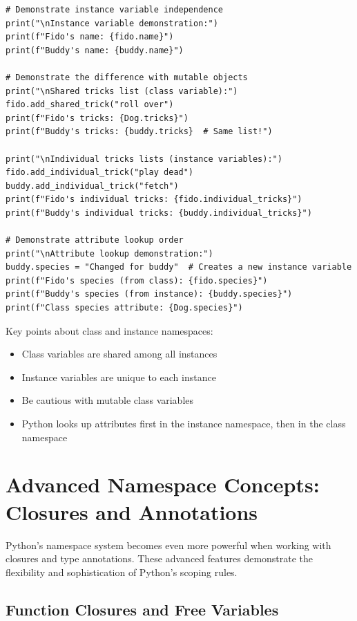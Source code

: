 \documentclass[12pt,letterpaper]{article}
\newenvironment{macterminal}{%
    \begin{mdframed}[
        linecolor=terminalFrame,
        backgroundcolor=terminalBg,
        roundcorner=5pt,
        skipabove=5pt,
        skipbelow=5pt,
        linewidth=1pt,
        innertopmargin=5pt,
        frametitle={%
            \tikz[baseline=(current bounding box.east), outer sep=0pt]{
                \fill[red!80!black] (0,0) circle (5pt);
                \fill[yellow!80!black] (0.7,0) circle (5pt);
                \fill[green!70!black] (1.4,0) circle (5pt);
            }
        },
        frametitlealignment=\raggedright,
        frametitleaboveskip=8pt,
        frametitlebelowskip=0pt,
    ]
}{%
    \end{mdframed}%
}
\begin{document}
\begin{macterminal}
\begin{lstlisting}
# Demonstrate instance variable independence
print("\nInstance variable demonstration:")
print(f"Fido's name: {fido.name}")
print(f"Buddy's name: {buddy.name}")

# Demonstrate the difference with mutable objects
print("\nShared tricks list (class variable):")
fido.add_shared_trick("roll over")
print(f"Fido's tricks: {Dog.tricks}")
print(f"Buddy's tricks: {buddy.tricks}  # Same list!")

print("\nIndividual tricks lists (instance variables):")
fido.add_individual_trick("play dead")
buddy.add_individual_trick("fetch")
print(f"Fido's individual tricks: {fido.individual_tricks}")
print(f"Buddy's individual tricks: {buddy.individual_tricks}")

# Demonstrate attribute lookup order
print("\nAttribute lookup demonstration:")
buddy.species = "Changed for buddy"  # Creates a new instance variable
print(f"Fido's species (from class): {fido.species}")
print(f"Buddy's species (from instance): {buddy.species}")
print(f"Class species attribute: {Dog.species}")
\end{lstlisting}
\end{macterminal}

Key points about class and instance namespaces:
\begin{itemize}
    \item Class variables are shared among all instances
    \item Instance variables are unique to each instance
    \item Be cautious with mutable class variables
    \item Python looks up attributes first in the instance namespace, then in the class namespace
\end{itemize}

\section{Advanced Namespace Concepts: Closures and Annotations}

Python's namespace system becomes even more powerful when working with closures and type annotations. These advanced features demonstrate the flexibility and sophistication of Python's scoping rules.

\subsection{Function Closures and Free Variables}
\end{document}
